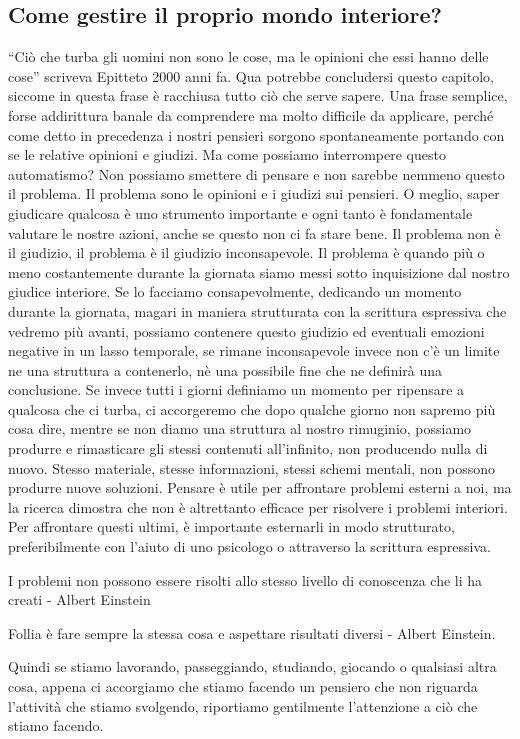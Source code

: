 \documentclass[12pt]{book} %
\begin{document}
\subsection{Come gestire il proprio mondo interiore?}
“Ciò che turba gli uomini non sono le cose, ma le opinioni che essi hanno delle cose” scriveva Epitteto 2000 anni fa.
Qua potrebbe concludersi questo capitolo, siccome in questa frase è racchiusa tutto ciò che serve sapere. Una frase
semplice, forse addirittura banale da comprendere ma molto difficile da applicare, perché come detto in precedenza i
nostri pensieri sorgono spontaneamente portando con se le relative opinioni e giudizi. Ma come possiamo interrompere
questo automatismo? Non possiamo smettere di pensare e non sarebbe nemmeno questo il problema. Il problema sono le
opinioni e i giudizi sui pensieri. O meglio, saper giudicare qualcosa è uno strumento importante e ogni tanto è
fondamentale valutare le nostre azioni, anche se questo non ci fa stare bene. Il problema non è il giudizio, il
problema è il giudizio inconsapevole. Il problema è quando più o meno costantemente durante la giornata siamo messi
sotto inquisizione dal nostro giudice interiore. Se lo facciamo consapevolmente, dedicando un momento durante la
giornata, magari in maniera strutturata con la scrittura espressiva che vedremo più avanti, possiamo contenere questo
giudizio ed eventuali emozioni negative in un lasso temporale, se rimane inconsapevole invece non
c'è un limite ne una struttura a contenerlo, nè una possibile fine che ne definirà una
conclusione. Se invece tutti i giorni definiamo un momento per ripensare a qualcosa che ci turba, ci accorgeremo che
dopo qualche giorno non sapremo più cosa dire, mentre se non diamo una struttura al nostro rimuginio, possiamo produrre
e rimasticare gli stessi contenuti all'infinito, non producendo nulla di nuovo. Stesso materiale,
stesse informazioni, stessi schemi mentali, non possono produrre nuove soluzioni. 
Pensare è utile per affrontare problemi esterni a noi, ma la ricerca dimostra che non è altrettanto efficace per risolvere i problemi interiori. Per affrontare questi ultimi, è importante esternarli in modo strutturato, preferibilmente con l’aiuto di uno psicologo o attraverso la scrittura espressiva.

I problemi non possono essere risolti allo stesso livello di conoscenza che li ha creati - Albert Einstein

Follia è fare sempre la stessa cosa e aspettare risultati diversi - Albert Einstein.

Quindi se stiamo lavorando, passeggiando, studiando, giocando o qualsiasi altra cosa, appena ci accorgiamo che stiamo
facendo un pensiero che non riguarda l'attività che stiamo svolgendo, riportiamo gentilmente
l'attenzione a ciò che stiamo facendo. 
\end{document}
